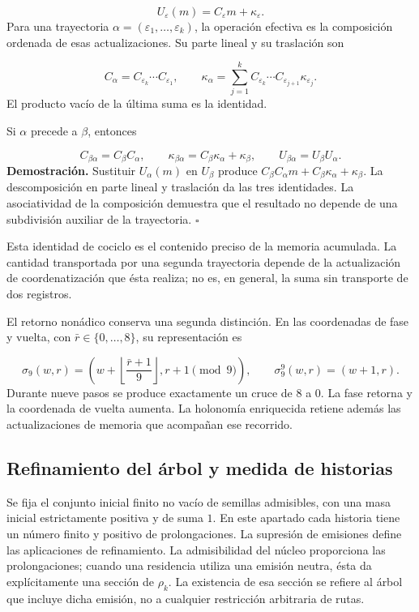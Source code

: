 \[
U_\varepsilon(m)=C_\varepsilon m+\kappa_\varepsilon.
\]
Para una trayectoria \(\alpha=(\varepsilon_1,\ldots,\varepsilon_k)\), la operación efectiva es la composición ordenada de esas actualizaciones. Su parte lineal y su traslación son

\[
C_\alpha=C_{\varepsilon_k}\cdots C_{\varepsilon_1},
\qquad
\kappa_\alpha=
\sum_{j=1}^{k}C_{\varepsilon_k}\cdots
C_{\varepsilon_{j+1}}\kappa_{\varepsilon_j}.
\]
El producto vacío de la última suma es la identidad.

Si \(\alpha\) precede a \(\beta\), entonces

\[
C_{\beta\alpha}=C_\beta C_\alpha,
\qquad
\kappa_{\beta\alpha}=C_\beta\kappa_\alpha+\kappa_\beta,
\qquad
U_{\beta\alpha}=U_\beta U_\alpha.
\]
\textbf{Demostración.} Sustituir \(U_\alpha(m)\) en \(U_\beta\) produce \(C_\beta C_\alpha m+C_\beta\kappa_\alpha+\kappa_\beta\). La descomposición en parte lineal y traslación da las tres identidades. La asociatividad de la composición demuestra que el resultado no depende de una subdivisión auxiliar de la trayectoria. \hfill\(\square\)

Esta identidad de cociclo es el contenido preciso de la memoria acumulada. La cantidad transportada por una segunda trayectoria depende de la actualización de coordenatización que ésta realiza; no es, en general, la suma sin transporte de dos registros.

El retorno nonádico conserva una segunda distinción. En las coordenadas de fase y vuelta, con \(\bar r\in\{0,\ldots,8\}\), su representación es

\[
\sigma_9(w,r)=
\left(w+\left\lfloor\frac{\bar r+1}{9}\right\rfloor,
r+1\pmod9\right),
\qquad
\sigma_9^9(w,r)=(w+1,r).
\]
Durante nueve pasos se produce exactamente un cruce de \(8\) a \(0\). La fase retorna y la coordenada de vuelta aumenta. La holonomía enriquecida retiene además las actualizaciones de memoria que acompañan ese recorrido.

\subsection{Refinamiento del árbol y medida de historias}
Se fija el conjunto inicial finito no vacío de semillas admisibles, con una masa inicial estrictamente positiva y de suma \(1\). En este apartado cada historia tiene un número finito y positivo de prolongaciones. La supresión de emisiones define las aplicaciones de refinamiento. La admisibilidad del núcleo proporciona las prolongaciones; cuando una residencia utiliza una emisión neutra, ésta da explícitamente una sección de \(\rho_k\). La existencia de esa sección se refiere al árbol que incluye dicha emisión, no a cualquier restricción arbitraria de rutas.


